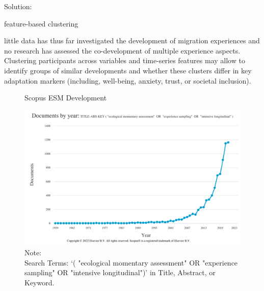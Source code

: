 \documentclass[man, 12pt, a4paper]{apa7}
\theoremstyle{break}
\theoremstyle{plain}
\begin{document}
Solution:   

feature-based clustering

little data has thus far investigated the development of migration experiences and no research has assessed the co-development of multiple experience aspects. Clustering participants across variables and time-series features may allow to identify groups of similar developments and whether these clusters differ in key adaptation markers (including, well-being, anxiety, trust, or societal inclusion).




%



\begin{figure}
  \caption{Scopus ESM Development}
  \label{fig:ScopusEsm}
  \centering\includegraphics[width=\textwidth]{figures/Scopus-ESM-Development.png}
  \caption*{Note: \\
  Search Terms: `( "ecological momentary assessment"  OR  "experience sampling"  OR  "intensive longitudinal")' in Title, Abstract, or Keyword.}
\end{figure}
\end{document}

